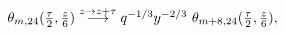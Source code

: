\begin{equation}
  \begin{array}{l}
  \theta_{m,24}({\tau\over 2}, {z\over 6})
  \stackrel{z\to z+\tau}{\longrightarrow} q^{-1/3}
  y^{-2/3} ~\theta_{m+8,24}({\tau\over 2}, {z\over 6}),
  \end{array}
\end{equation}

